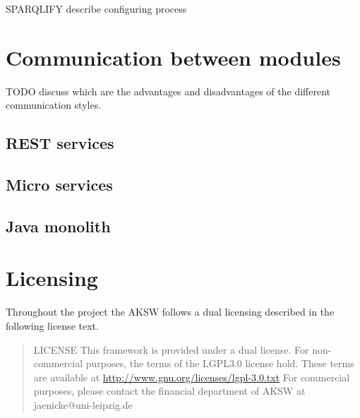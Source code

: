 \documentclass{scrartcl}
\begin{document}
SPARQLIFY
describe configuring process

\section{Communication between modules}

TODO discuss which are the advantages and disadvantages of the different communication styles.

\subsection{REST services}

\subsection{Micro services}

\subsection{Java monolith}



\section{Licensing}

Throughout the project the AKSW follows a dual licensing described in the following license text.

\begin{quotation}
LICENSE
This framework is provided under a dual license. For non-commercial purposes, the terms of the LGPL3.0 license hold. These terms are available at \url{http://www.gnu.org/licenses/lgpl-3.0.txt} \newline 
For commercial purposes, please contact the financial department of AKSW at jaenicke@uni-leipzig.de
\end{quotation}
\end{document}
